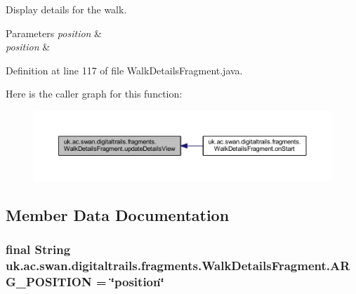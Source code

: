 Display details for the walk. 


\begin{DoxyParams}{Parameters}
{\em position} & \\
\hline
{\em position} & \\
\hline
\end{DoxyParams}


Definition at line 117 of file Walk\+Details\+Fragment.\+java.



Here is the caller graph for this function\+:\nopagebreak
\begin{figure}[H]
\begin{center}
\leavevmode
\includegraphics[width=350pt]{classuk_1_1ac_1_1swan_1_1digitaltrails_1_1fragments_1_1_walk_details_fragment_aa087d10188a545f579ce03e886bea006_icgraph}
\end{center}
\end{figure}




\subsection{Member Data Documentation}
\hypertarget{classuk_1_1ac_1_1swan_1_1digitaltrails_1_1fragments_1_1_walk_details_fragment_a02d99d54cee133857e5cfa141b6e778f}{
\subsubsection[{A\+R\+G\+\_\+\+P\+O\+S\+I\+T\+I\+O\+N}]{\setlength{\rightskip}{0pt plus 5cm}final String uk.\+ac.\+swan.\+digitaltrails.\+fragments.\+Walk\+Details\+Fragment.\+A\+R\+G\+\_\+\+P\+O\+S\+I\+T\+I\+O\+N = \char`\"{}position\char`\"{}\hspace{0.3cm}{\ttfamily [static]}}}\label{classuk_1_1ac_1_1swan_1_1digitaltrails_1_1fragments_1_1_walk_details_fragment_a02d99d54cee133857e5cfa141b6e778f}


